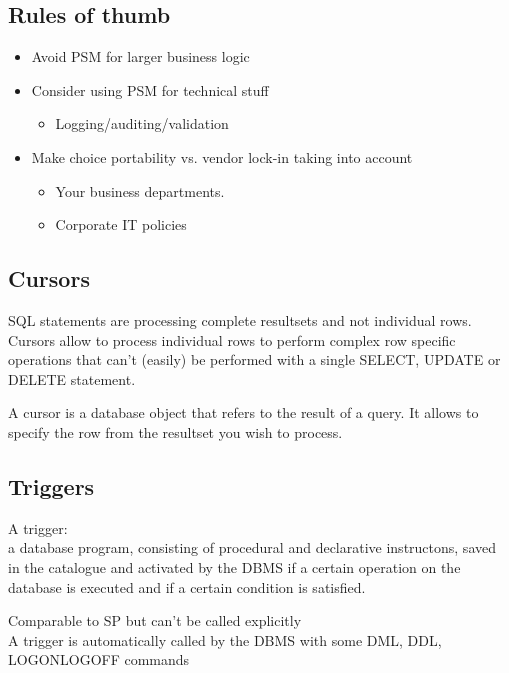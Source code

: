 \documentclass{report}
\begin{document}
    \subsection{Rules of thumb}
    \begin{itemize}
        \item Avoid PSM for larger business logic
        \item Consider using PSM for technical stuff
        \begin{itemize}
            \item Logging/auditing/validation
        \end{itemize}
        \item Make choice portability vs. vendor lock-in taking into account
        \begin{itemize}
            \item Your business departments.
            \item Corporate IT policies
        \end{itemize}
    \end{itemize}

    \subsection{Cursors}
    \begin{theo}[Cursor]
    SQL statements are processing complete resultsets and not individual rows. Cursors allow to process individual rows to perform complex row specific operations that can't (easily) be performed with a single SELECT, UPDATE or DELETE statement.
    \end{theo}
    A cursor is a database object that refers to the result of a query. It allows to specify the row from the resultset you wish to process.
    
    \subsection{Triggers}
        \begin{theo}[Trigger]
        A trigger:\\
        a database program, consisting of procedural and declarative instructons, saved in the catalogue and activated by the DBMS if a certain operation on the database is executed and if a certain condition is satisfied.
    \end{theo}
    Comparable to SP but can't be called explicitly
   \\
   A trigger is automatically called by the DBMS with some DML, DDL, LOGONLOGOFF commands
\end{document}
